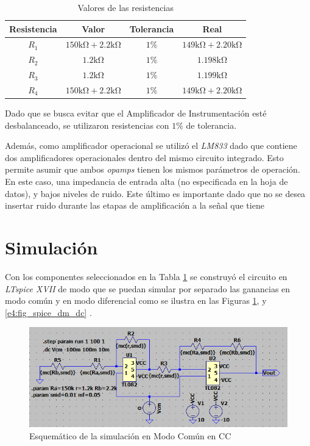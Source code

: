 \begin{table}[ht]
\begin{center}
\begin{tabular}{||c|c|c|c||}
\hline
Resistencia	&	Valor &	Tolerancia & Real\\
\hline	
$R_1$	&	$150\si{\kilo\ohm} + 2.2\si{\kilo\ohm}$	&	$1\%$	&	$149\si{\kilo\ohm} + 2.20\si{\kilo\ohm}$ \\
$R_2$	&	$1.2\si{\kilo\ohm}$	&	$1\%$	&	$1.198\si{\kilo\ohm}$ \\
$R_3$	&	$1.2\si{\kilo\ohm}$	&	$1\%$	&	$1.199\si{\kilo\ohm}$ \\
$R_4$	&	$150\si{\kilo\ohm} + 2.2\si{\kilo\ohm}$	&	$1\%$	&	$149\si{\kilo\ohm} + 2.20\si{\kilo\ohm}$ \\
\hline
\end{tabular}
\end{center}
\caption{Valores de las resistencias}
\label{e4:tab_res_vals}
\end{table}

Dado que se busca evitar que el Amplificador de Instrumentación esté desbalanceado, se utilizaron resistencias con $1\%$ de tolerancia.

Además, como amplificador operacional se utilizó el \textit{LM833} dado que contiene dos amplificadores operacionales dentro del mismo circuito integrado. Esto permite asumir que ambos \textit{opamps} tienen los mismos parámetros de operación. En este caso, una impedancia de entrada alta (no especificada en la hoja de datos), y bajos niveles de ruido. Este último es importante dado que no se desea insertar ruido durante las etapas de amplificación a la señal que tiene 

\newpage
\section{Simulación}

Con los componentes seleccionados en la Tabla \ref{e4:tab_res_vals} se construyó el circuito en \textit{LTspice XVII} de modo que se puedan simular por separado las ganancias en modo común y en modo diferencial como se ilustra en las Figuras
\ref{e4:fig_spice_cm_dc},
 y 
\ref{e4:fig_spice_dm_dc}
.
\begin{figure}[!ht]
\begin{center}
\includegraphics[width=\linewidth]{res/spice/spice_cm_dc_sch.png}
\caption{Esquemático de la simulación en Modo Común en CC}
\label{e4:fig_spice_cm_dc}
\end{center}
\end{figure}

